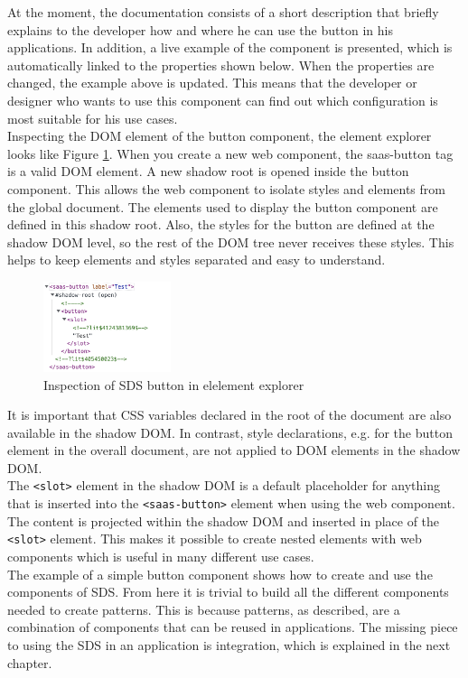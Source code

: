 At the moment, the documentation consists of a short description that briefly explains to the developer how and where he can use the button in his applications. In addition, a live example of the component is presented, which is automatically linked to the properties shown below. When the properties are changed, the example above is updated. This means that the developer or designer who wants to use this component can find out which configuration is most suitable for his use cases. \\
Inspecting the DOM element of the button component, the element explorer looks like Figure \ref{button_element_explorer}. When you create a new web component, the saas-button tag is a valid DOM element. A new shadow root is opened inside the button component. This allows the web component to isolate styles and elements from the global document. The elements used to display the button component are defined in this shadow root. Also, the styles for the button are defined at the shadow DOM level, so the rest of the DOM tree never receives these styles. This helps to keep elements and styles separated and easy to understand. \\
\begin{figure}[htbp]
    \centerline{\includegraphics[height=100px]{images/button_element_explorer.png}}
    \caption{Inspection of \ac{SDS} button in elelement explorer}
    \label{button_element_explorer}
\end{figure}
It is important that \ac{CSS} variables declared in the root of the document are also available in the shadow DOM. In contrast, style declarations, e.g. for the button element in the overall document, are not applied to DOM elements in the shadow DOM. \\
The \texttt{<slot>} element in the shadow DOM is a default placeholder for anything that is inserted into the \texttt{<saas-button>} element when using the web component. The content is projected within the shadow DOM and inserted in place of the \texttt{<slot>} element. This makes it possible to create nested elements with web components which is useful in many different use cases. \\

The example of a simple button component shows how to create and use the components of \ac{SDS}. From here it is trivial to build all the different components needed to create patterns. This is because patterns, as described, are a combination of components that can be reused in applications. The missing piece to using the \ac{SDS} in an application is integration, which is explained in the next chapter.